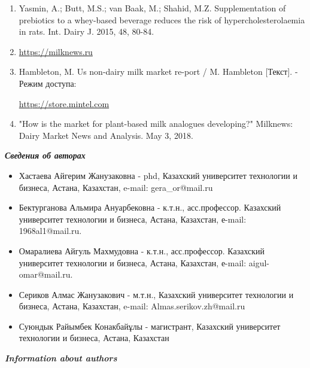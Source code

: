 \begin{enumerate}
\item
Yasmin, A.; Butt, M.S.; van Baak, M.; Shahid, M.Z. Supplementation of
prebiotics to a whey-based beverage reduces the risk of
hypercholesterolaemia in rats. Int. Dairy J. 2015, 48, 80-84.

\item
\href{https://milknews.ru/longridy/rastitelniye-analogi-moloka.html}{https://milknews.ru}

\item
Hambleton, M. Us non-dairy milk market re-port / M. Hambleton
{[}Текст{]}. - Режим доступа:

\href{https://store.mintel.com/US-NON-DAIRY-MILK-MAR-KET-REPORT}{https://store.mintel.com}

\item
"How is the market for plant-based milk analogues developing?" Milknews: Dairy Market News and Analysis. May 3, 2018.
\end{enumerate}

\emph{{\bfseries Сведения об авторах}}

\begin{itemize}
\item
Хастаева Айгерим Жанузаковна - phd, Казахский университет технологии и
бизнеса, Астана, Казахстан, e-mail: gera\_or@mail.ru

\item
Бектурганова Альмира Ануарбековна - к.т.н., асс.профессор. Казахский
университет технологии и бизнеса, Астана, Казахстан, е-mail:
1968al1@mail.ru.

\item
Омаралиева Айгуль Махмудовна - к.т.н., асс.профессор. Казахский
университет технологии и бизнеса, Астана, Казахстан, е-mail:
aigul-omar@mail.ru.

\item
Сериков Алмас Жанузакович - м.т.н., Казахский университет технологии и
бизнеса, Астана, Казахстан, e-mail: Almas.serikov.zh@mail.ru

\item
Суюндык Райымбек Конакбайұлы - магистрант, Казахский университет
технологии и бизнеса, Астана, Казахстан
\end{itemize}

\emph{{\bfseries Information about authors}}

